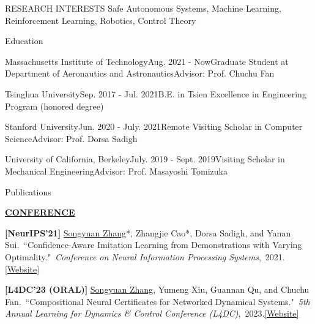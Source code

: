 \documentclass{resume} %
\newcommand{\paperItem}[4]{#1.~``#2."~\textit{#3},~#4.}%
\newcommand{\me}{\underline{Songyuan Zhang}}
\newcommand{\meshort}{\textbf{S. Zhang}}
\newcommand{\person}[2]{#1}
\begin{document}
	\begin{rSection}{RESEARCH INTERESTS}
		Safe Autonomous Systems, Machine Learning, Reinforcement Learning, Robotics, Control Theory
	\end{rSection}

	\begin{rSection}{Education} 		
		\begin{rSubsection2}{Massachusetts Institute of Technology}{Aug. 2021 - Now}{Graduate Student at Department of Aeronautics and Astronautics}{Advisor: Prof. Chuchu Fan}
		\end{rSubsection2} 
	
		\begin{rSubsection2}{Tsinghua University}{Sep. 2017 - Jul. 2021}{B.E. in Tsien Excellence in Engineering Program (honored degree)}{\\} 
		\end{rSubsection2}
		\vspace{-10pt}
        
        \begin{rSubsection2}{Stanford University}{Jun. 2020 - July. 2021}{Remote Visiting Scholar in Computer Science}{Advisor: Prof. Dorsa Sadigh}
		\end{rSubsection2}

		\begin{rSubsection2}{University of California, Berkeley}{July. 2019 - Sept. 2019}{Visiting Scholar in Mechanical Engineering}{Advisor: Prof. Masayoshi Tomizuka}
		\end{rSubsection2}
	\end{rSection}

	\begin{rSection}{Publications}
		\item[] \textbf{\underline{CONFERENCE}}
		\vspace{5pt}
		{
			\item {\bf [NeurIPS'21]}
			\paperItem{\person{\me*}{\meshort}, \person{Zhangjie Cao*}{Z. Cao}, \person{Dorsa Sadigh}{D. Sadigh}, and \person{Yanan Sui}{Y. Sui}}{Confidence-Aware Imitation Learning from Demonstrations with Varying Optimality}{Conference on Neural Information Processing Systems}{2021}{\href{https://sites.google.com/view/cail/}{[Website]}}
			\item {\bf [L4DC'23 (ORAL)]}
			\paperItem{\person{\me}{\meshort}, \person{Yumeng Xiu}{Y. Xiu}, \person{Guannan Qu}{G. Qu}, and \person{Chuchu Fan}{C. Fan}}{Compositional Neural Certificates for Networked Dynamical Systems}{5th Annual Learning for Dynamics \& Control Conference (L4DC)}{2023}{\href{https://mit-realm.github.io/neuriss-website/}{[Website]}}
		}
	\end{rSection}
\end{document}
